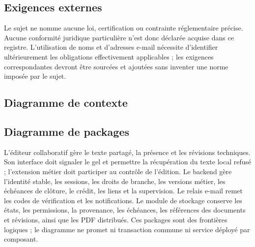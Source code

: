 \subsection{Exigences externes}
Le sujet ne nomme aucune loi, certification ou contrainte réglementaire précise. Aucune conformité juridique particulière n'est donc déclarée acquise dans ce registre. L'utilisation de noms et d'adresses e-mail nécessite d'identifier ultérieurement les obligations effectivement applicables ; les exigences correspondantes devront être sourcées et ajoutées sans inventer une norme imposée par le sujet.

\subsection{Diagramme de contexte}
\subsection{Diagramme de packages}
L'éditeur collaboratif gère le texte partagé, la présence et les révisions techniques. Son interface doit signaler le gel et permettre la récupération du texte local refusé ; l'extension métier doit participer au contrôle de l'édition. Le backend gère l'identité stable, les sessions, les droits de branche, les versions métier, les échéances de clôture, le crédit, les liens et la supervision. Le relais e-mail remet les codes de vérification et les notifications. Le module de stockage conserve les états, les permissions, la provenance, les échéances, les références des documents et révisions, ainsi que les PDF distribués. Ces packages sont des frontières logiques ; le diagramme ne promet ni transaction commune ni service déployé par composant.

